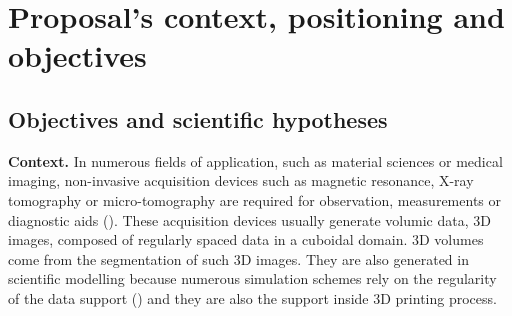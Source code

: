 \section{Proposal's context, positioning and objectives}
\label{sec:context}

\subsection{Objectives and scientific hypotheses}
\label{sec:goals}


\noindent\textbf{Context.}
In numerous fields of application, such as material sciences
or medical imaging, non-invasive acquisition devices such as magnetic
resonance, X-ray tomography or micro-tomography are required for
observation, measurements or diagnostic aids
(\eg \cite{Hildebrand1999,dcoeurjo_flin_ImPro}). %
These acquisition devices usually generate volumic data, \ie
3D images, composed of regularly spaced data in a cuboidal domain.
3D volumes come from the segmentation of such 3D images.
They are also generated in scientific modelling because
numerous simulation schemes rely on the regularity of the data support
(\eg \cite{wojtan2007animating,jones2010directable,marechal2010heat}) and they are also the support inside 3D printing process.




